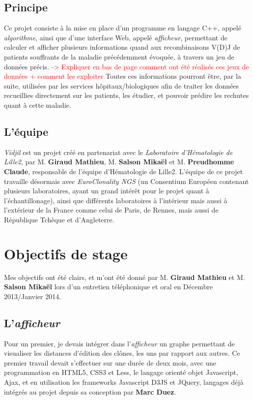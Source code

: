 \documentclass{report}
\begin{document}
\subsection{Principe}
Ce projet consiste à la mise en place d'un programme en langage C++, appelé \textit{algorithme}, ainsi que d'une interface Web, appelé \textit{afficheur}, permettant de calculer et afficher plusieurs informations quand aux recombinaisons V(D)J de patients souffrants de la maladie précédemment évoquée, à travers un jeu de données précis.
\newline
\textcolor{red}{-> Expliquer en bas de page comment ont été réalisés ces jeux de données + comment les exploiter}
\newline
Toutes ces informations pourront être, par la suite, utilisées par les services hôpitaux/biologiques afin de traiter les données recueillies directement sur les patients, les étudier, et pouvoir prédire les rechutes quant à cette maladie.

\subsection{L'équipe}
\textit{Vidjil} est un projet créé en partenariat avec le \textit{Laboratoire d'Hématologie de Lille2}, par M. \textbf{Giraud Mathieu}, M. \textbf{Salson Mikaël} et M. \textbf{Preudhomme Claude}, responsable de l'équipe d'Hématologie de Lille2.
\newline
L'équipe de ce projet travaille désormais avec \textit{EuroClonality NGS} (un Consentium Européen contenant plusieurs laboratoires, ayant un grand intérêt pour le projet quant à l'échantillonage), ainsi que différents laboratoires à l'intérieur mais aussi à l'extérieur de la France comme celui de Paris, de Rennes, mais aussi de République Tchèque et d'Angleterre.

\section{Objectifs de stage}
Mes objectifs ont été clairs, et m'ont été donné par M. \textbf{Giraud Mathieu} et M. \textbf{Salson Mikaël} lors d'un entretien téléphonique et oral en Décembre 2013/Janvier 2014.

\subsection{L'\textit{afficheur}}
Pour un premier, je devais intégrer dans l'\textit{afficheur} un graphe permettant de visualiser les distances d'édition des clônes, les uns par rapport aux autres.
\newline
Ce premier travail devait s'effectuer sur une durée de deux mois, avec une programmation en HTML5, CSS3 et Less, le langage orienté objet Javascript, Ajax, et en utilisation les frameworks Javascript D3JS et JQuery, langages déjà intégrés au projet depuis sa conception par \textbf{Marc Duez}.
\end{document}
